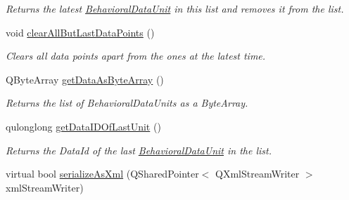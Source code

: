 \begin{DoxyCompactItemize}
\begin{DoxyCompactList}\small\item\em Returns the latest \hyperlink{class_picto_1_1_behavioral_data_unit}{Behavioral\-Data\-Unit} in this list and removes it from the list. \end{DoxyCompactList}\item 
\hypertarget{class_picto_1_1_behavioral_data_unit_package_ab01fb1e68f935b7182819065b0e285f9}{void \hyperlink{class_picto_1_1_behavioral_data_unit_package_ab01fb1e68f935b7182819065b0e285f9}{clear\-All\-But\-Last\-Data\-Points} ()}\label{class_picto_1_1_behavioral_data_unit_package_ab01fb1e68f935b7182819065b0e285f9}

\begin{DoxyCompactList}\small\item\em Clears all data points apart from the ones at the latest time. \end{DoxyCompactList}\item 
\hypertarget{class_picto_1_1_behavioral_data_unit_package_a1f507ee7d23ca857f8c511bc00c25c52}{Q\-Byte\-Array \hyperlink{class_picto_1_1_behavioral_data_unit_package_a1f507ee7d23ca857f8c511bc00c25c52}{get\-Data\-As\-Byte\-Array} ()}\label{class_picto_1_1_behavioral_data_unit_package_a1f507ee7d23ca857f8c511bc00c25c52}

\begin{DoxyCompactList}\small\item\em Returns the list of Behavioral\-Data\-Units as a Byte\-Array. \end{DoxyCompactList}\item 
\hypertarget{class_picto_1_1_behavioral_data_unit_package_a30584418819b9470c03885c72ab0ea77}{qulonglong \hyperlink{class_picto_1_1_behavioral_data_unit_package_a30584418819b9470c03885c72ab0ea77}{get\-Data\-I\-D\-Of\-Last\-Unit} ()}\label{class_picto_1_1_behavioral_data_unit_package_a30584418819b9470c03885c72ab0ea77}

\begin{DoxyCompactList}\small\item\em Returns the Data\-Id of the last \hyperlink{class_picto_1_1_behavioral_data_unit}{Behavioral\-Data\-Unit} in the list. \end{DoxyCompactList}\item 
\hypertarget{class_picto_1_1_behavioral_data_unit_package_a601a643bb3b7d9d669d4b9ecd8304db4}{virtual bool \hyperlink{class_picto_1_1_behavioral_data_unit_package_a601a643bb3b7d9d669d4b9ecd8304db4}{serialize\-As\-Xml} (Q\-Shared\-Pointer$<$ Q\-Xml\-Stream\-Writer $>$ xml\-Stream\-Writer)}\label{class_picto_1_1_behavioral_data_unit_package_a601a643bb3b7d9d669d4b9ecd8304db4}


\end{DoxyCompactItemize}

